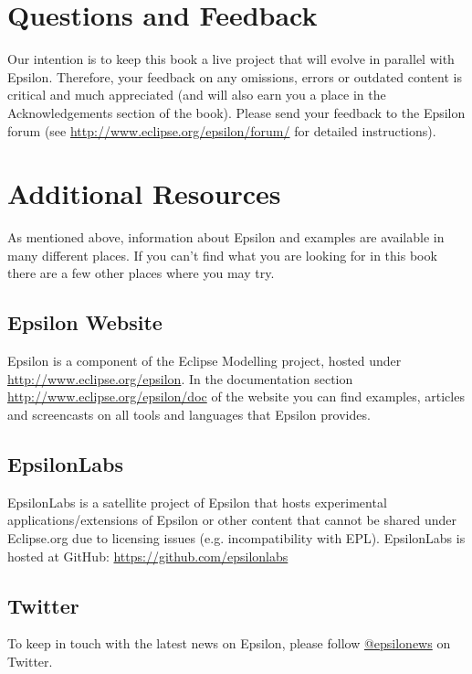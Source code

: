 \section{Questions and Feedback}

Our intention is to keep this book a live project that will evolve in parallel with Epsilon. Therefore, your feedback on any omissions, errors or outdated content is critical and much appreciated (and will also earn you a place in the Acknowledgements section of the book). Please send your feedback to the Epsilon forum  (see \url{http://www.eclipse.org/epsilon/forum/} for detailed instructions).

\section{Additional Resources}

As mentioned above, information about Epsilon and examples are available in many different places. If you can't find what you are looking for in this book there are a few other places where you may try.

\subsection{Epsilon Website}
Epsilon is a component of the Eclipse Modelling project, hosted under \url{http://www.eclipse.org/epsilon}. In the documentation section \url{http://www.eclipse.org/epsilon/doc} of the website you can find examples, articles and screencasts on all tools and languages that Epsilon provides.

\subsection{EpsilonLabs}

EpsilonLabs is a satellite project of Epsilon that hosts experimental applications/extensions of Epsilon or other content that cannot be shared under Eclipse.org due to licensing issues (e.g. incompatibility with EPL). EpsilonLabs is hosted at GitHub: \url{https://github.com/epsilonlabs}

\subsection{Twitter}
To keep in touch with the latest news on Epsilon, please follow \href{http://twitter.com/#!/epsilonews}{@epsilonews} on Twitter.